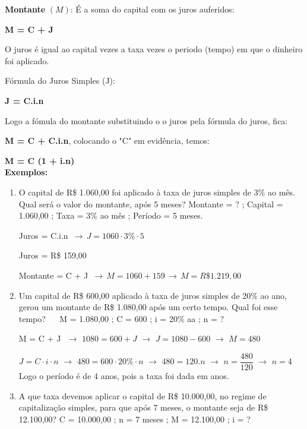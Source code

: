 \begin{multicols*}{2}
    \textbf{Montante} $(M)$: É a soma do capital com os juros auferidos:

    \textbf{M = C + J}

    O juros é igual ao capital vezes a taxa vezes o periodo (tempo) em que o dinheiro foi aplicado.

    Fórmula do Juros Simples (J):

    \textbf{J = C.i.n}

    Logo a fómula do montante substituindo o o juros pela fórmula do juros, fica:

    \textbf{M = C + C.i.n}, colocando o "C" em evidência, temos:

    \textbf{M = C (1 + i.n)}\\

    \textbf{Exemplos:}

    \begin{enumerate}

        \item O capital de R\$ 1.060,00 foi aplicado à taxa de juros simples de 3\% ao mês. Qual será o valor do montante, após 5 meses?		Montante = ?  ;  Capital = 1.060,00  ;  Taxa = 3\% ao mês  ;  Período = 5 meses.

              Juros = C.i.n  $\, \rightarrow \,  J = 1060 \cdot 3\% \cdot 5$

              Juros = R\$ 159,00

              Montante = C + J $ \, \rightarrow \, M = 1060 + 159 \, \rightarrow \, M = R\$1.219,00$

        \item Um capital de R\$ 600,00 aplicado à taxa de juros simples de 20\% ao ano, gerou  um  montante  de R\$ 1.080,00 após um certo tempo. Qual foi esse tempo?  $\, \, \, \, \, \, $  M = 1.080,00 ; C = 600 ; i = 20\% aa ; n = ?

              M = C + J $\, \, \rightarrow \, \,  1080 = 600 + J \, \, \rightarrow \, \, J = 1080 - 600 \, \, \rightarrow \, \, M= 480$

              $ J = C\cdot i \cdot n \, \, \rightarrow \, \, 480 = 600 \cdot 20\% \cdot n \, \, \rightarrow \, \, 480 = 120.n \, \, \rightarrow \, \, n = \dfrac{480}{120}\, \, \rightarrow \, \, n = 4 $ Logo o período é de 4 anos, pois a taxa foi dada em anos.

        \item A que taxa devemos aplicar o capital de R\$ 10.000,00, no regime de capitalização simples, para que após 7 meses, o montante seja de R\$ 12.100,00?  C = 10.000,00  ;  n = 7 meses  ;  M = 12.100,00 ;  i = ?


\end{enumerate}
\end{multicols*}
